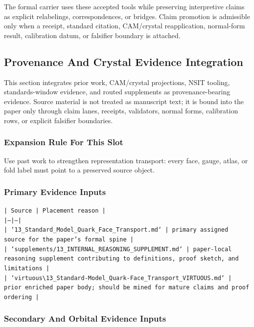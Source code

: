 \documentclass[11pt]{article}
\begin{document}
The formal carrier uses these accepted tools while preserving interpretive
claims as explicit relabelings, correspondences, or bridges. Claim promotion is admissible only when a receipt, standard citation,
CAM/crystal reapplication, normal-form result, calibration datum, or falsifier
boundary is attached.

\subsection*{Provenance And Crystal Evidence Integration}

This section integrates prior work, CAM/crystal projections, NSIT tooling,
standards-window evidence, and routed supplements as provenance-bearing
evidence. Source material is not treated as manuscript text; it is bound into
the paper only through claim lanes, receipts, validators, normal forms,
calibration rows, or explicit falsifier boundaries.

\subsubsection*{Expansion Rule For This Slot}

Use past work to strengthen representation transport: every face, gauge, atlas, or fold label must point to a preserved source object.

\subsubsection*{Primary Evidence Inputs}

\noindent\texttt{| Source | Placement reason |}\\
\noindent\texttt{|---|---|}\\
\noindent\texttt{| `13\_Standard\_Model\_Quark\_Face\_Transport.md` | primary assigned source for the paper's formal spine |}\\
\noindent\texttt{| `supplements/13\_INTERNAL\_REASONING\_SUPPLEMENT.md` | paper-local reasoning supplement contributing to definitions, proof sketch, and limitations |}\\
\noindent\texttt{| `virtuous\textbackslash{}13\_Standard-Model\_Quark-Face\_Transport\_VIRTUOUS.md` | prior enriched paper body; should be mined for mature claims and proof ordering |}\\

\subsubsection*{Secondary And Orbital Evidence Inputs}
\end{document}
